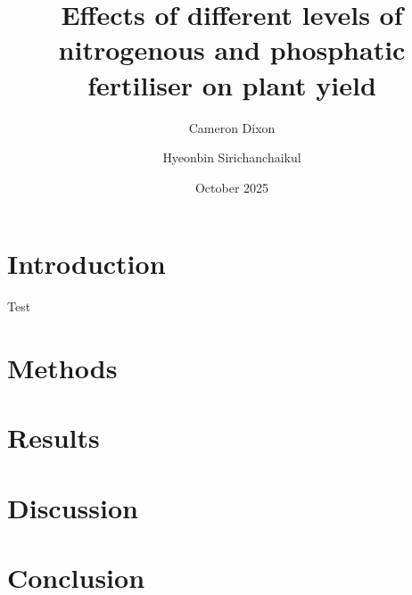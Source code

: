 \documentclass[12pt]{article}
\title{Effects of different levels of nitrogenous and phosphatic fertiliser on plant yield}
\author{Cameron Dixon}
\author{Hyeonbin Sirichanchaikul}
\affil{The University of Queensland}
\date{October 2025}
\begin{document}
\maketitle

\section{Introduction}
Test \parencite{temp}

\section{Methods}

\section{Results}

\section{Discussion}

\section{Conclusion}

\newpage

\printbibliography
\end{document}
